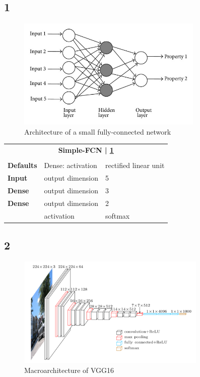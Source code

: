 \subsection*{1}
\begin{figure}[h]
	\centering
	\includegraphics[height=200px]{gfx/Dense_FFNetwork.jpg}
	\caption{Architecture of a small fully-connected network\\
		\cite{dense_network}}
	\label{fig:FFNetwork}
\end{figure}
\begin{tabularx}{\textwidth}[!h]{X X X}
	\multicolumn{3}{c}{\textbf{Simple-FCN | \ref{fig:FFNetwork}}}\\
	\\
	\hline
	\endhead
	\textbf{Defaults} & Dense: activation & rectified linear unit\\
	\hline
	\textbf{Input} & output dimension & 5\\
	[8pt]
	\textbf{Dense} & output dimension & 3\\
	[8pt]
	\textbf{Dense} & output dimension & 2\\
	& activation & softmax\\
	\hline
\end{tabularx}

\newpage

\subsection*{2}

\begin{figure}[h]
	\centering
	\includegraphics[height=200px]{gfx/vgg16.png}
	\caption{Macroarchitecture of VGG16\\
		\cite{VGG16}}
	\label{fig:VGG16}
\end{figure}


